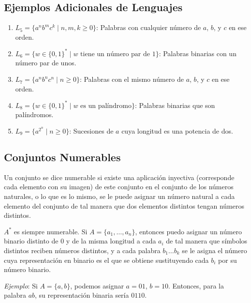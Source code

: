 \documentclass[12pt]{report} %
\providecommand{\tightlist}{%
  \setlength{\itemsep}{0pt}\setlength{\parskip}{0pt}}
\begin{document}
\hypertarget{ejemplos-adicionales-de-lenguajes}{%
\subsection{Ejemplos Adicionales de
Lenguajes}\label{ejemplos-adicionales-de-lenguajes}}

\begin{enumerate}
\def\labelenumi{\arabic{enumi}.}
\tightlist
\item
  \(L_5 = \{a^n b^m c^k \mid n, m, k \geq 0\}\): Palabras con cualquier
  número de \(a\), \(b\), y \(c\) en ese orden.\\
\item
  \(L_6 = \{w \in \{0, 1\}^* \mid w \text{ tiene un número par de } 1\}\):
  Palabras binarias con un número par de unos.\\
\item
  \(L_7 = \{a^n b^n c^n \mid n \geq 0\}\): Palabras con el mismo número
  de \(a\), \(b\), y \(c\) en ese orden.\\
\item
  \(L_8 = \{w \in \{0, 1\}^* \mid w \text{ es un palíndromo}\}\):
  Palabras binarias que son palíndromos.\\
\item
  \(L_9 = \{a^{2^n} \mid n \geq 0\}\): Sucesiones de \(a\) cuya longitud
  es una potencia de dos.
\end{enumerate}

\hypertarget{conjuntos-numerables}{%
\subsection{Conjuntos Numerables}\label{conjuntos-numerables}}

Un conjunto se dice numerable si existe una aplicación inyectiva
(corresponde cada elemento con su imagen) de este conjunto en el
conjunto de los números naturales, o lo que es lo mismo, se le puede
asignar un número natural a cada elemento del conjunto de tal manera que
dos elementos distintos tengan números distintos.

\begin{ejemplo}
$A^*$ es siempre numerable. Si $A = \{a_1, \ldots, a_n\}$, entonces puedo asignar un número binario distinto de 0 y de la misma longitud a cada $a_i$ de tal manera que símbolos distintos reciben números distintos, y a cada palabra $b_1 \ldots b_k$ se le asigna el número cuya representación en binario es el que se obtiene sustituyendo cada $b_i$ por su número binario.  

\textit{Ejemplo}: Si $A = \{a, b\}$, podemos asignar $a = 01$, $b = 10$. Entonces, para la palabra $ab$, su representación binaria sería $0110$.  
\end{ejemplo}
\end{document}
